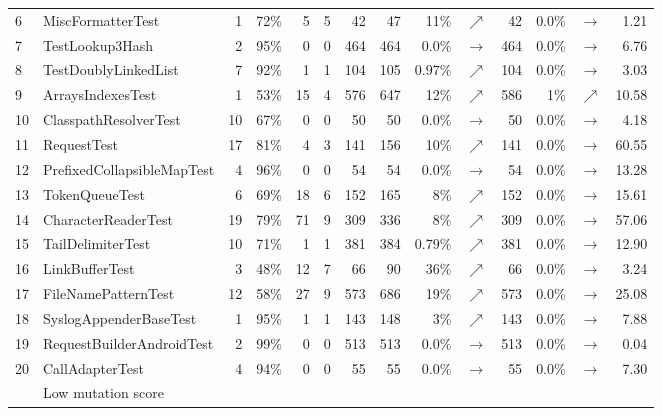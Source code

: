 \documentclass[table,xcdraw,smallextended]{svjour3}
\newcommand{\ms}{mutation score\xspace}
\begin{document}
\begin{table}
\begin{tabular}{|llrrrr|rrrr|rrr|r|}
\rowcolor[HTML]{EFEFEF}
6&\scriptsize{MiscFormatterTest}&1&72\%&5&5&42&47&11\%&{\color{ForestGreen}$\nearrow$}&42&0.0\%&$\rightarrow$&1.21 \\
7&\scriptsize{TestLookup3Hash}&2&95\%&0&0&464&464&0.0\%&$\rightarrow$&464&0.0\%&$\rightarrow$&6.76 \\
\rowcolor[HTML]{EFEFEF}
8&\scriptsize{TestDoublyLinkedList}&7&92\%&1&1&104&105&0.97\%&{\color{ForestGreen}$\nearrow$}&104&0.0\%&$\rightarrow$&3.03 \\
9&\scriptsize{ArraysIndexesTest}&1&53\%&15&4&576&647&12\%&{\color{ForestGreen}$\nearrow$}&586&1\%&{\color{ForestGreen}$\nearrow$}&10.58 \\
\rowcolor[HTML]{EFEFEF}
10&\scriptsize{ClasspathResolverTest}&10&67\%&0&0&50&50&0.0\%&$\rightarrow$&50&0.0\%&$\rightarrow$&4.18 \\
11&\scriptsize{RequestTest}&17&81\%&4&3&141&156&10\%&{\color{ForestGreen}$\nearrow$}&141&0.0\%&$\rightarrow$&60.55 \\
\rowcolor[HTML]{EFEFEF}
12&\scriptsize{PrefixedCollapsibleMapTest}&4&96\%&0&0&54&54&0.0\%&$\rightarrow$&54&0.0\%&$\rightarrow$&13.28 \\
13&\scriptsize{TokenQueueTest}&6&69\%&18&6&152&165&8\%&{\color{ForestGreen}$\nearrow$}&152&0.0\%&$\rightarrow$&15.61 \\
\rowcolor[HTML]{EFEFEF}
14&\scriptsize{CharacterReaderTest}&19&79\%&71&9&309&336&8\%&{\color{ForestGreen}$\nearrow$}&309&0.0\%&$\rightarrow$&57.06 \\
15&\scriptsize{TailDelimiterTest}&10&71\%&1&1&381&384&0.79\%&{\color{ForestGreen}$\nearrow$}&381&0.0\%&$\rightarrow$&12.90 \\
\rowcolor[HTML]{EFEFEF}
16&\scriptsize{LinkBufferTest}&3&48\%&12&7&66&90&36\%&{\color{ForestGreen}$\nearrow$}&66&0.0\%&$\rightarrow$&3.24 \\
17&\scriptsize{FileNamePatternTest}&12&58\%&27&9&573&686&19\%&{\color{ForestGreen}$\nearrow$}&573&0.0\%&$\rightarrow$&25.08 \\
\rowcolor[HTML]{EFEFEF}
18&\scriptsize{SyslogAppenderBaseTest}&1&95\%&1&1&143&148&3\%&{\color{ForestGreen}$\nearrow$}&143&0.0\%&$\rightarrow$&7.88 \\
19&\scriptsize{RequestBuilderAndroidTest}&2&99\%&0&0&513&513&0.0\%&$\rightarrow$&513&0.0\%&$\rightarrow$&0.04 \\
\rowcolor[HTML]{EFEFEF}
20&\scriptsize{CallAdapterTest}&4&94\%&0&0&55&55&0.0\%&$\rightarrow$&55&0.0\%&$\rightarrow$&7.30 \\
\hline
&\multicolumn{3}{l}{Low \ms}\\

\end{tabular}
\end{table}
\end{document}
